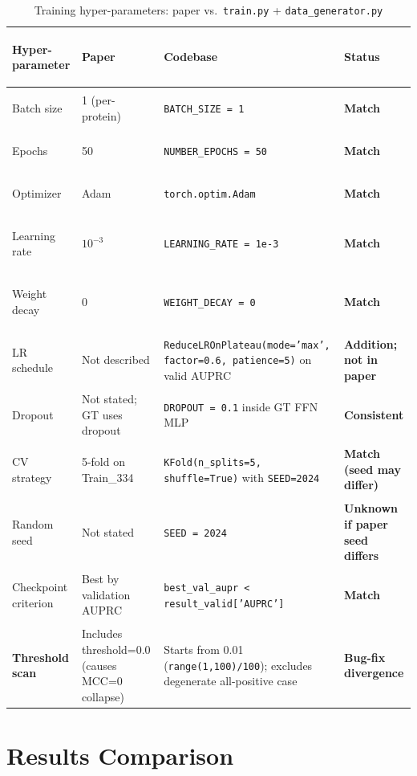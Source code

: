 \documentclass[10pt, a4paper]{article}
\newcommand{\match}[1]{\textcolor{okgreen}{\textbf{#1}}}
\newcommand{\mismatch}[1]{\textcolor{warnorange}{\textbf{#1}}}
\newcommand{\warn}[1]{\textcolor{warnorange}{\textbf{#1}}}
\newcommand{\code}[1]{\texttt{\small #1}}
\begin{document}
\begin{table}[ht]
\caption{Training hyper-parameters: paper vs.\ \code{train.py} + \code{data\_generator.py}}
\label{tab:training}
\begin{tabularx}{\linewidth}{>{\footnotesize\bfseries\raggedright\arraybackslash}p{2.6cm}
    Y Y
    >{\footnotesize\centering\arraybackslash}p{2.6cm}}
\toprule
\normalsize\textbf{Hyper-parameter} & \normalsize\textbf{Paper} & \normalsize\textbf{Codebase} & \normalsize\textbf{Status} \\
\midrule
Batch size   & 1 (per-protein)   & \code{BATCH\_SIZE = 1}   & \match{Match} \\
Epochs       & 50                & \code{NUMBER\_EPOCHS = 50} & \match{Match} \\
Optimizer    & Adam              & \code{torch.optim.Adam}  & \match{Match} \\
Learning rate & $10^{-3}$        & \code{LEARNING\_RATE = 1e-3} & \match{Match} \\
Weight decay & 0                 & \code{WEIGHT\_DECAY = 0} & \match{Match} \\
LR schedule  & Not described &
  \code{ReduceLROnPlateau(mode='max', factor=0.6, patience=5)} on valid AUPRC &
  \mismatch{Addition; not in paper} \\
Dropout      & Not stated; GT uses dropout & \code{DROPOUT = 0.1} inside GT FFN MLP & \match{Consistent} \\
CV strategy  & 5-fold on Train\_334 &
  \code{KFold(n\_splits=5, shuffle=True)} with \code{SEED=2024} &
  \match{Match (seed may differ)} \\
Random seed  & Not stated        & \code{SEED = 2024} & \warn{Unknown if paper seed differs} \\
Checkpoint criterion & Best by validation AUPRC &
  \code{best\_val\_aupr < result\_valid['AUPRC']} &
  \match{Match} \\
\textbf{Threshold scan} &
  Includes threshold=0.0 (causes MCC=0 collapse) &
  Starts from 0.01 (\code{range(1,100)/100}); excludes degenerate all-positive case &
  \mismatch{Bug-fix divergence} \\
\bottomrule
\end{tabularx}
\end{table}

\newpage

\section{Results Comparison}
\end{document}
